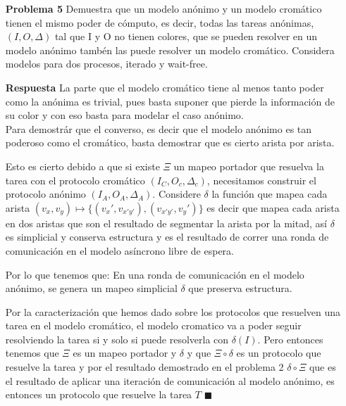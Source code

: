 \documentclass{article}
\begin{document}
\begin{enumerate}
\item[\bf{Problema 5}] Demuestra que un modelo anónimo y un modelo cromático tienen el mismo poder de cómputo, es decir, todas las tareas anónimas, $(I, O, \Delta)$ tal que
I y O no tienen colores, que se pueden resolver en un modelo anónimo tambén las puede resolver un modelo cromático.
Considera modelos para dos procesos, iterado y wait-free.

\item[\bf{Respuesta}] La parte que el modelo cromático tiene al menos tanto poder como la anónima es trivial, pues basta suponer que pierde la información de su color y con eso basta para modelar el caso anónimo.\\

Para demostrár que el converso, es decir que el modelo anónimo es tan poderoso como el cromático, basta demostrar que es cierto arista por arista.

Esto es cierto debido a que si existe $\Xi$ un mapeo portador que resuelva la tarea con el protocolo cromático $(I_C, O_c, \Delta_c)$, necesitamos construir el protocolo anónimo $(I_A, O_A, \Delta_A)$. 
Considere $\delta$ la función que mapea cada arista $(v_x,v_y) \mapsto \{(v_x',v_{x'y'}),(v_{x'y'},v_y')\}$ es decir que mapea cada arista en dos aristas que son el resultado de segmentar la arista por la mitad, así $\delta$ es simplicial y conserva estructura y es el resultado de correr una ronda de comunicación en el modelo asíncrono libre de espera.

Por lo que tenemos que: En una ronda de comunicación en el modelo anónimo, se genera un mapeo simplicial $\delta$ que preserva estructura.

Por la caracterización que hemos dado sobre los protocolos que resuelven una tarea en el modelo cromático, el modelo cromatico va a poder seguir resolviendo la tarea si y solo si puede resolverla con $\delta(I)$. Pero entonces tenemos que $\Xi$ es un mapeo portador y $\delta$ y que $\Xi \circ \delta$ es un protocolo que resuelve la tarea y por el resultado demostrado en el problema 2 $\delta \circ \Xi$ que es el resultado de aplicar una iteración de comunicación al modelo anónimo, es entonces un protocolo que resuelve la tarea $T$ $\blacksquare$

\end{enumerate}
\end{document}
